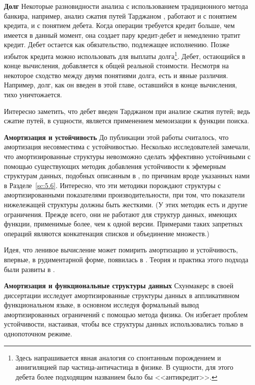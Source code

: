 \noindent
\textbf{Долг} Некоторые разновидности анализа с использованием
традиционного метода банкира, например, анализ сжатия путей Тарджаном
\cite{Tarjan1983}, работают и с понятием кредита, и с понятием
дебета.  Когда операции требуется кредит больше, чем имеется в данный
момент, она создает пару кредит-дебет и немедленно тратит
кредит. Дебет остается как обязательство, подлежащее исполнению. Позже
избыток кредита можно использовать для выплаты долга\footnote{Здесь
  напрашивается явная аналогия со спонтанным порождением и
  аннигиляцией пар частица-античастица в физике. В сущности, для этого
  дебета более подходящим названием было бы <<антикредит>>.
}.
Дебет, остающийся в конце вычисления, добавляется к общей реальной
стоимости. Несмотря на некоторое сходство между двумя понятиями долга,
есть и явные различия. Например, долг, как он введен в этой главе,
оставшийся в конце вычисления, тихо уничтожается.

Интересно заметить, что дебет введен Тарджаном при анализе сжатия
путей; ведь сжатие путей, в сущности, является применением мемоизации
к функции поиска.

\noindent
\textbf{Амортизация и устойчивость} До публикации этой работы
считалось, что амортизация несовместима с устойчивостью.  Несколько
исследователей \cite{DriscollSleatorTarjan1994, Raman1992} замечали,
что амортизированные структуры невозможно сделать эффективно
устойчивыми с помощью существующих методик добавления устойчивости к
эфемерным структурам данных, подобных описанным в
\cite{Driscolletal1989, Dietz1989}, по причинам вроде указанных нами в
Разделе~\ref{sc:5.6}. Интересно, что эти методики порождают структуры
с амортизированными показателями производительности, при том, что
показатели нижележащей структуры должны быть жесткими. (У этих методик
есть и другие ограничения. Прежде всего, они не работают для структур
данных, имеющих функции, применимые более, чем к одной
версии. Примерами таких запретных операций являются конкатенация
списков и объединение множеств.)

Идея, что ленивое вычисление может помирить амортизацию и устойчивость,
впервые, в рудиментарной форме, появилась в
\cite{Okasaki1995c}. Теория и практика этого подхода были развиты в
\cite{Okasaki1995a, Okasaki1996b}.

\noindent
\textbf{Амортизация и функциональные структуры данных} Схунмакерс
\cite{Schoenmakers1993} в своей диссертации исследует амортизированные
структуры данных в аппликативном функциональном языке, в основном
исследуя формальный вывод амортизированных ограничений с помощью
метода физика. Он избегает проблем устойчивости, настаивая, чтобы все
структуры данных использовались только в однопоточном режиме.


